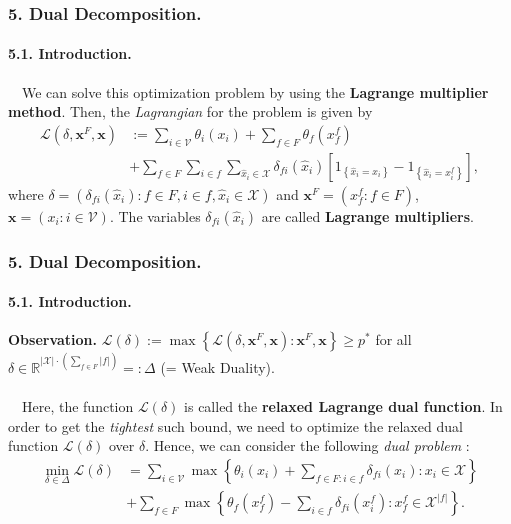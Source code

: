 \documentclass[11pt]{beamer}
\newtheorem*{pf of lemma}{\it Proof of the \normalfont \bf Lemma}
\newtheorem*{pf of claim}{\it Proof of the \normalfont \sf Claim}
\begin{document}
\begin{frame}
\frametitle{5. Dual Decomposition.}
\framesubtitle{5.1. Introduction.}

\ \ \indent We can solve this optimization problem by using the \textbf{Lagrange multiplier method}. Then, the \textit{Lagrangian} for the problem is given by
\begin{align*}
\mathcal{L} \left(\delta, \mathbf{x}^F, \mathbf{x} \right) &:= \sum_{i \in \mathcal{V}} \theta_i (x_i) + \sum_{f \in F} \theta_f \left(x_{f}^f \right) \\
&+ \sum_{f \in F} \sum_{i \in f} \sum_{\hat{x}_i \in \mathcal{X}} \delta_{fi} \left(\hat{x}_i \right) \left[ 1_{\left\{\hat{x}_i = x_i \right\}} - 1_{\left\{\hat{x}_i = x_{i}^f \right\}} \right],
\end{align*}
where $\delta = \left( \delta_{fi} \left(\hat{x}_i \right) : f \in F, i \in f, \hat{x}_i \in \mathcal{X} \right)$ and $\mathbf{x}^F = \left(x_{f}^f : f \in F \right)$, $\mathbf{x} = \left( x_i : i \in \mathcal{V} \right)$. The variables $\delta_{fi} \left( \hat{x}_i \right)$ are called \textbf{Lagrange multipliers}.
\end{frame}

\begin{frame}
\frametitle{5. Dual Decomposition.}
\framesubtitle{5.1. Introduction.}
\textbf{Observation.} $\mathcal{L} \left( \delta \right) := \max \left\{ \mathcal{L} \left(\delta, \mathbf{x}^F, \mathbf{x} \right) : \mathbf{x}^F, \mathbf{x} \right\} \geq p^*$ for all $\delta \in \mathbb{R}^{|\mathcal{X}| \cdot \left( \sum_{f \in F} |f| \right)} =: \Delta$ (= Weak Duality). \\ \ \\
\ \ \indent Here, the function $\mathcal{L} \left( \delta \right)$ is called the \textbf{relaxed Lagrange dual function}. In order to get the \textit{tightest} such bound, we need to optimize the relaxed dual function $\mathcal{L} \left( \delta \right)$ over $\delta$. Hence, we can consider the following \textit{dual problem} : 
\begin{align*}
\min_{\delta \in \Delta} \mathcal{L} \left( \delta \right)  &= \sum_{i \in \mathcal{V}} \max \left\{ \theta_i (x_i) + \sum_{f \in F : i \in f} \delta_{fi}(x_i) : x_i \in \mathcal{X} \right\} \\ 
&+ \sum_{f \in F} \max \left\{ \theta_f \left( x_{f}^f \right) - \sum_{i \in f} \delta_{fi} \left( x_{i}^f \right) : x_{f}^f \in \mathcal{X}^{|f|} \right\}.
\end{align*}
\end{frame}
\end{document}
